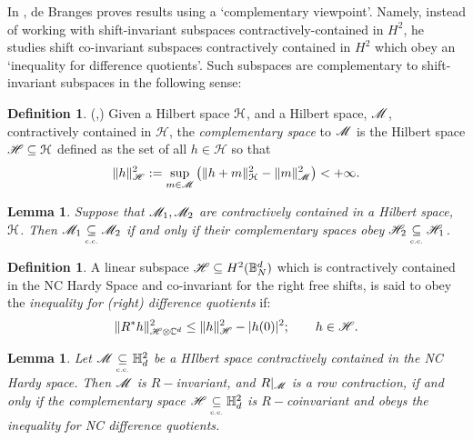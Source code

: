 \documentclass[11pt]{article}
\newcommand{\scr}{\ensuremath{\mathscr}}
\newcommand{\mc}{\ensuremath{\mathcal}}
\def\C{\mathbb{C}}
\def\B{\mathbb{B}}
\def\bH{\mathbb{H}}
\def\cc{\underset{\mbox{\tiny \mbox{\tiny c.c.}}}{\subseteq}}
\renewcommand{\H}{\ensuremath{\mathcal{H} }}
\numberwithin{equation}{section}
\numberwithin{subsection}{section}
\newtheorem{lemma}[subsection]{Lemma}
\theoremstyle{definition}
\newtheorem{defn}[subsection]{Definition}
\begin{document}
In \cite{dB-ss}, de Branges proves results using a `complementary viewpoint'. Namely, instead of working with shift-invariant subspaces contractively-contained in $H^2$, he studies shift co-invariant subspaces contractively contained in $H^2$ which obey an `inequality for difference quotients'. Such subspaces are complementary to shift-invariant subspaces in the following sense: 


\begin{defn}{ (\cite{dBss},\cite[Section 16.9]{FMHb2})}
    Given a Hilbert space $\mc{H}$, and a Hilbert space, $\scr{M}$, contractively contained in $\H$, the \emph{complementary space} to $\scr{M}$ is the Hilbert space $\scr{H} \subseteq \H$ defined as the set of all $h \in \H$ so that 
$$ \| h \| ^2 _\scr{H} := \sup _{m \in \scr{M}} \left( \| h +m \| ^2 _{\mc{H}} - \| m \| ^2 _{\scr{M}} \right) < +\infty. $$ 
\end{defn}
\begin{lemma}
Suppose that $\scr{M} _1 , \scr{M} _2$ are contractively contained in a Hilbert space, $\mc{H}$. Then $\scr{M} _1 \cc \scr{M} _2$ if and only if their complementary spaces obey $\scr{H} _2 \cc \scr{H} _1$.
\end{lemma}
\begin{defn}
    A linear subspace $\scr{H} \subseteq H^2 (\B ^d _N ) $ which is contractively contained in the NC Hardy Space and co-invariant for the right free shifts, is said 
    to obey the \emph{inequality for (right) difference quotients} if:
$$ \| R ^* h \| _{\scr{H} \otimes \C ^d } ^2 \leq \| h \| ^2 _\scr{H}  - | h(0) | ^2; \quad \quad h \in \scr{H}. $$
\end{defn}



\begin{lemma}
Let $\scr{M} \cc \bH ^2 _d$ be a HIlbert space contractively contained in the NC Hardy space. Then $\scr{M}$ is $R-$invariant, and $R|_{\scr{M}}$ is a row contraction, if and only if the complementary space $\scr{H} \cc \bH ^2 _d$ is $R-$coinvariant and obeys the inequality for NC difference quotients.
\end{lemma}
\end{document}
